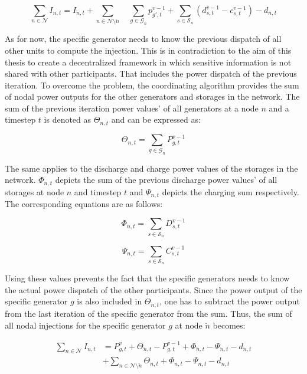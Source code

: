  \begin{equation}
 	\sum_{n \in \mathcal{N}} I_{n,t} = I_{\breve{n},t} + \sum_{n \in \mathcal{N} \setminus \breve{n}} \quad \sum_{g\in\mathcal{G}_n}p_{g',t}^{v-1} + \sum_{s\in\mathcal{S}_n}(d_{s,t}^{v-1}-c_{s,t}^{v-1})-d_{n,t}
 \end{equation}
 
 As for now, the specific generator needs to know the previous dispatch of all other units to compute the injection. This is in contradiction to the aim of this thesis to create a decentralized framework in which sensitive information is not shared with other participants. That includes the power dispatch of the previous iteration. To overcome the problem, the coordinating algorithm provides the sum of nodal power outputs for the other generators and storages in the network. The sum of the previous iteration power values' of all generators at a node $n$ and a timestep $t$ is denoted as $\Theta_{n,t}$ and can be expressed as:
 
 \begin{equation}
 	\Theta_{n,t} = \sum_{g\in\mathcal{G}_{n}}P_{g,t}^{v-1}
 \end{equation}
 
 The same applies to the discharge and charge power values of the storages in the network. $\Phi_{n,t}$ depicts the sum of the previous discharge power values' of all storages at node $n$ and timestep $t$ and $\Psi_{n,t}$ depicts the charging sum respectively. The corresponding equations are as follows:
 
\begin{equation}
	\Phi_{n,t} = \sum_{s\in\mathcal{S}_n}D_{s,t}^{v-1}
\end{equation}

\begin{equation}
	\Psi_{n,t} = \sum_{s\in\mathcal{S}_n}C_{s,t}^{v-1}
\end{equation}
 
 Using these values prevents the fact that the specific generators needs to know the actual power dispatch of the other participants. Since the power output of the specific generator $g$ is also included in $\Theta_{\breve{n},t}$, one has to subtract the power output from the last iteration of the specific generator from the sum. Thus, the sum of all nodal injections for the specific generator $g$ at node $\breve{n}$ becomes: 

 \begin{align}
 	\sum_{n \in \mathcal{N}} I_{n,t} &= P_{g,t}^v + \Theta_{\breve{n},t} - P_{g,t}^{v-1} + \Phi_{\breve{n},t} - \Psi_{\breve{n},t} - d_{\breve{n},t} \\
 	& + \sum_{n \in \mathcal{N} \setminus \breve{n}} \Theta_{n,t} + \Phi_{n,t} - \Psi_{n,t} - d_{n,t} \nonumber
 \end{align}
 
